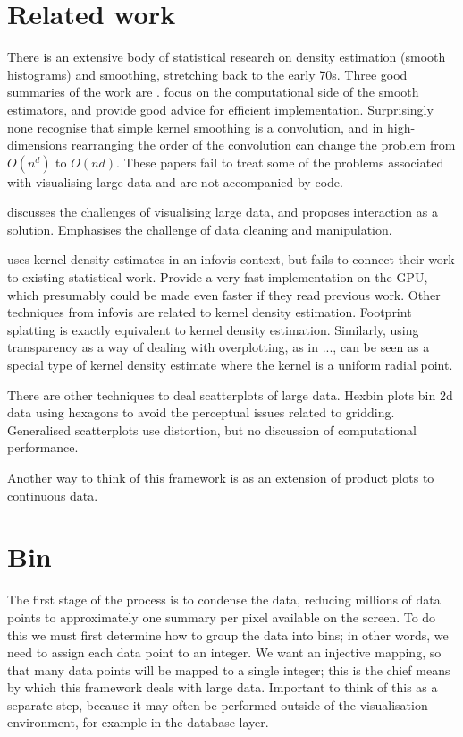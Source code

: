\documentclass[journal]{vgtc}                %
\begin{document}
\section{Related work}
\label{sec:related-work}

There is an extensive body of statistical research on density estimation (smooth histograms) and smoothing, stretching back to the early 70s. Three good summaries of the work are \cite{scott:1992,bowman:1997,loader:1999a}.    \cite{hardle:1992,wand:1994,fan:1994} focus on the computational side of the smooth estimators, and provide good advice for efficient implementation.  Surprisingly none recognise that simple kernel smoothing is a convolution, and in high-dimensions rearranging the order of the convolution can change the problem from $O(n^d)$ to $O(nd)$. These papers fail to treat some of the problems associated with visualising large data and are not accompanied by code.

\citep{heer:2012} discusses the challenges of visualising large data, and proposes interaction as a solution. Emphasises the challenge of data cleaning and manipulation.

\citep{lampe:2011} uses kernel density estimates in an infovis context, but fails to connect their work to existing statistical work. Provide a very fast implementation on the GPU, which presumably could be made even faster if they read previous work. Other techniques from infovis are related to kernel density estimation. Footprint splatting \citep{becker:1997,yang:2003} is exactly equivalent to kernel density estimation.  Similarly, using transparency as a way of dealing with overplotting, as in ..., can be seen as a special type of kernel density estimate where the kernel is a uniform radial point.

There are other techniques to deal scatterplots of large data. Hexbin plots \citep{carr:1987} bin 2d data using hexagons to avoid the perceptual issues related to gridding. Generalised scatterplots \citep{keim:2010} use distortion, but no discussion of computational performance.  

Another way to think of this framework is as an extension of product plots \citep{me:prodplots} to continuous data.  

\section{Bin}
\label{sec:bin}

The first stage of the process is to condense the data, reducing millions of data points to approximately one summary per pixel available on the screen.  To do this we must first determine how to group the data into bins; in other words, we need to assign each data point to an integer. We want an injective mapping, so that many data points will be mapped to a single integer; this is the chief means by which this framework deals with large data. Important to think of this as a separate step, because it may often be performed outside of the visualisation environment, for example in the database layer. 
\end{document}
